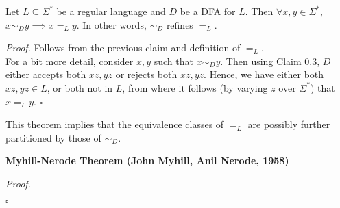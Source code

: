 \documentclass[a4paper]{article}
\newenvironment{proof}{\begin{breakbox}\textit{Proof.}}{\hfill$\square$\end{breakbox}}
\newcommand{\nl}{\vspace{0.2cm}\\}
\begin{document}
\begin{theorem}
    Let $L \subseteq \Sigma^*$ be a regular language and $D$ be a DFA for $L$. Then $\forall x, y \in \Sigma^*$, $x \sim_D y \implies x =_L y$. In other words, $\sim_D$ refines $=_L$.
\end{theorem}

\begin{proof}
    Follows from the previous claim and definition of $=_L$.\nl
    For a bit more detail, consider $x, y$ such that $x \sim_D y$. Then using Claim 0.3, $D$ either accepts both $xz, yz$ or rejects both $xz, yz$. Hence, we have either both $xz, yz \in L$, or
    both not in $L$, from where it follows (by varying $z$ over $\Sigma^*$) that $x =_L y$.
\end{proof}

\begin{note}
    This theorem implies that the equivalence classes of $=_L$ are possibly further partitioned by those of $\sim_D$.
\end{note}

\begin{theorem}
    \textbf{Myhill-Nerode Theorem (John Myhill, Anil Nerode, 1958)}\nl

\end{theorem}

\begin{proof}

\end{proof}
\end{document}
